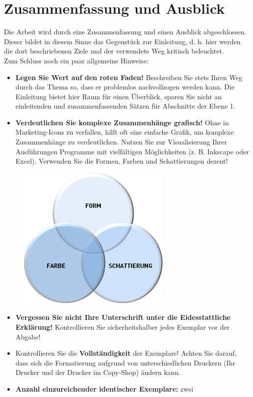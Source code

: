 \chapter{Zusammenfassung und Ausblick}\thispagestyle{fancy}

Die Arbeit wird durch eine Zusammenfassung und einen Ausblick abgeschlossen. Dieser bildet in diesem Sinne das Gegenstück zur Einleitung, d. h. hier werden die dort beschriebenen Ziele und der verwendete Weg kritisch beleuchtet.\\
Zum Schluss noch ein paar allgemeine Hinweise:

\begin{itemize}
\item \textbf{Legen Sie Wert auf den roten Faden!} Beschreiben Sie stets Ihren Weg durch das Thema so, dass er problemlos nachvollzogen werden kann. Die Einleitung bietet hier Raum für einen Überblick, sparen Sie nicht an einleitenden und zusammenfassenden Sätzen für Abschnitte der Ebene 1.
\item \textbf{Verdeutlichen Sie komplexe Zusammenhänge grafisch!} Ohne in Marketing-Icons zu verfallen, hilft oft eine einfache Grafik, um komplexe Zusammenhänge zu verdeutlichen. Nutzen Sie zur Visualisierung Ihrer Ausführungen Programme mit vielfältigen Möglichkeiten (z. B. Inkscape oder Excel). Verwenden Sie die Formen, Farben und Schattierungen dezent! 
\end{itemize}

\begin{figure}[h]
\centering
\includegraphics[scale=1.0]{images/Abbildung2.png}
\end{figure}

\begin{itemize}
\item \textbf{Vergessen Sie nicht Ihre Unterschrift unter die Eidesstattliche Erklärung!} Kontrollieren Sie sicherheitshalber jedes Exemplar vor der Abgabe! 
\item Kontrollieren Sie die \textbf{Vollständigkeit} der Exemplare! Achten Sie darauf, dass sich die Formatierung aufgrund von unterschiedlichen Druckern (Ihr Drucker und der Drucker im Copy-Shop) ändern kann. 
\item \textbf{Anzahl einzureichender identischer Exemplare:} zwei 
\end{itemize}